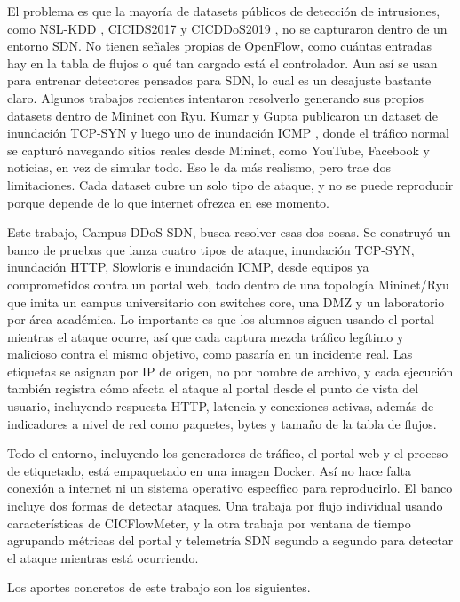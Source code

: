 \documentclass[a4paper,fleqn]{cas-dc}
\begin{document}
El problema es que la mayoría de datasets públicos de detección de intrusiones, como NSL-KDD \citep{tavallaee2009nslkdd}, CICIDS2017 \citep{sharafaldin2018cicflowmeter} y CICDDoS2019 \citep{sharafaldin2019cicddos2019}, no se capturaron dentro de un entorno SDN. No tienen señales propias de OpenFlow, como cuántas entradas hay en la tabla de flujos o qué tan cargado está el controlador. Aun así se usan para entrenar detectores pensados para SDN, lo cual es un desajuste bastante claro. Algunos trabajos recientes intentaron resolverlo generando sus propios datasets dentro de Mininet con Ryu. Kumar y Gupta publicaron un dataset de inundación TCP-SYN \citep{kumar2025synflood} y luego uno de inundación ICMP \citep{kumar2026icmpfloodsdn}, donde el tráfico normal se capturó navegando sitios reales desde Mininet, como YouTube, Facebook y noticias, en vez de simular todo. Eso le da más realismo, pero trae dos limitaciones. Cada dataset cubre un solo tipo de ataque, y no se puede reproducir porque depende de lo que internet ofrezca en ese momento.

Este trabajo, Campus-DDoS-SDN, busca resolver esas dos cosas. Se construyó un banco de pruebas que lanza cuatro tipos de ataque, inundación TCP-SYN, inundación HTTP, Slowloris e inundación ICMP, desde equipos ya comprometidos contra un portal web, todo dentro de una topología Mininet/Ryu que imita un campus universitario con switches core, una DMZ y un laboratorio por área académica. Lo importante es que los alumnos siguen usando el portal mientras el ataque ocurre, así que cada captura mezcla tráfico legítimo y malicioso contra el mismo objetivo, como pasaría en un incidente real. Las etiquetas se asignan por IP de origen, no por nombre de archivo, y cada ejecución también registra cómo afecta el ataque al portal desde el punto de vista del usuario, incluyendo respuesta HTTP, latencia y conexiones activas, además de indicadores a nivel de red como paquetes, bytes y tamaño de la tabla de flujos.

Todo el entorno, incluyendo los generadores de tráfico, el portal web y el proceso de etiquetado, está empaquetado en una imagen Docker. Así no hace falta conexión a internet ni un sistema operativo específico para reproducirlo. El banco incluye dos formas de detectar ataques. Una trabaja por flujo individual usando características de CICFlowMeter, y la otra trabaja por ventana de tiempo agrupando métricas del portal y telemetría SDN segundo a segundo para detectar el ataque mientras está ocurriendo.

Los aportes concretos de este trabajo son los siguientes.
\end{document}
